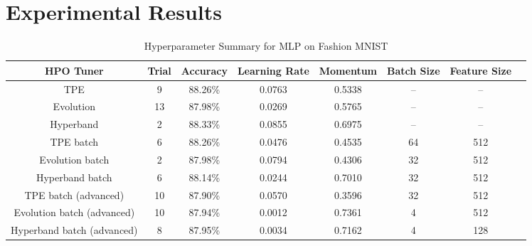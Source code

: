 \documentclass{article}
\begin{document}
\section{Experimental Results}

\begin{table}[ht]
	\caption{Hyperparameter Summary for MLP on Fashion MNIST} %
	\centering %
	\begin{tabular}{c c c c c c c c } %
		\hline\hline %
		HPO Tuner                  & Trial & Accuracy & Learning Rate & Momentum & Batch Size & Feature Size \\ [0.5ex] %
		\hline %
		TPE                        & 9     & 88.26\%  & 0.0763        & 0.5338   & --         & --           \\
		Evolution                  & 13    & 87.98\%  & 0.0269        & 0.5765   & --         & --           \\
		Hyperband                  & 2     & 88.33\%  & 0.0855        & 0.6975   & --         & --           \\
		TPE batch                  & 6     & 88.26\%  & 0.0476        & 0.4535   & 64         & 512          \\
		Evolution batch            & 2     & 87.98\%  & 0.0794        & 0.4306   & 32         & 512          \\
		Hyperband batch            & 6     & 88.14\%  & 0.0244        & 0.7010   & 32         & 512          \\
		TPE batch (advanced)       & 10    & 87.90\%  & 0.0570        & 0.3596   & 32         & 512          \\
		Evolution batch (advanced) & 10    & 87.94\%  & 0.0012        & 0.7361   & 4          & 512          \\
		Hyperband batch (advanced) & 8     & 87.95\%  & 0.0034        & 0.7162   & 4          & 128          \\
		[1ex] %
		\hline %
	\end{tabular}
	\label{table:summary} %
\end{table}
\end{document}
